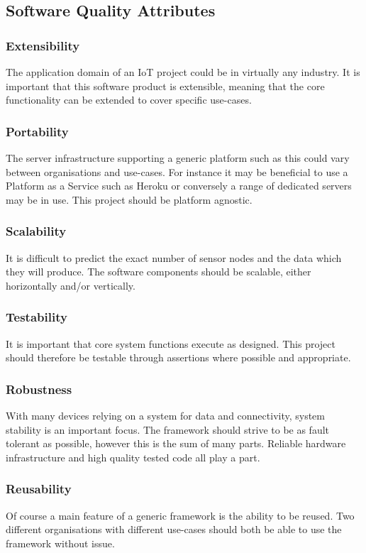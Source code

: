     \subsection{Software Quality Attributes}
      \subsubsection{Extensibility}
        The application domain of an IoT project could be in virtually any industry. It is important that this software product is extensible, meaning that the core functionality can be extended to cover specific use-cases.

      \subsubsection{Portability}
        The server infrastructure supporting a generic platform such as this could vary between organisations and use-cases. For instance it may be beneficial to use a Platform as a Service such as Heroku or conversely a range of dedicated servers may be in use. This project should be platform agnostic. 

      \subsubsection{Scalability}
        It is difficult to predict the exact number of sensor nodes and the data which they will produce. The software components should be scalable, either horizontally and/or vertically.

      \subsubsection{Testability}
        It is important that core system functions execute as designed. This project should therefore be testable through assertions where possible and appropriate.

      \subsubsection{Robustness}
        With many devices relying on a system for data and connectivity, system stability is an important focus. The framework should strive to be as fault tolerant as possible, however this is the sum of many parts. Reliable hardware infrastructure and high quality tested code all play a part.

      \subsubsection{Reusability}
        Of course a main feature of a generic framework is the ability to be reused. Two different organisations with different use-cases should both be able to use the framework without issue.
